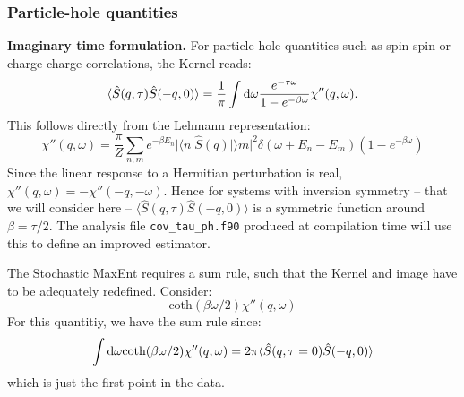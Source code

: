 \subsubsection{Particle-hole quantities }

\noindent
\textbf{Imaginary time formulation.}
 For particle-hole quantities such as spin-spin or charge-charge correlations, 
the  Kernel reads:
\begin{equation}
	\langle \hat{S}(q,\tau) \hat{S}(-q,0) \rangle  = \frac{1}{\pi} 
   \int {\text d} \omega  \frac{e^{- \tau \omega} }{ 1 - e^{-\beta  \omega} } \chi''(q,\omega).
\end{equation}
This follows directly from the  Lehmann representation: 
\begin{equation}
 \chi''(q,\omega)  = \frac{\pi}{Z} \sum_{n,m} e^{-\beta E_n} |\langle n | \hat{S}(q) | \rangle m |^2 
\delta ( \omega + E_n - E_m) \left( 1 - e^{-\beta  \omega} \right) 
\end{equation}
Since the linear response to a Hermitian perturbation  is real, $\chi''(q,\omega)  = - \chi''(-q,-\omega)$.  Hence for systems with inversion symmetry -- that 
we will consider here -- $\langle \hat{S}(q,\tau) \hat{S}(-q,0) \rangle $ is a symmetric function around $\beta= \tau/2$.  The analysis  file \texttt{cov\_tau\_ph.f90} produced at compilation
time will use this  to define an improved estimator. 

The  Stochastic MaxEnt requires a sum rule, such that   the Kernel and image have to be adequately redefined. 
Consider: 
\begin{equation}
	\text{coth}(\beta \omega/2) \chi''(q,\omega)
\end{equation}
For this quantitiy, we have the sum rule since: 
\begin{equation}
	\int {\text d} \omega 	\text{coth}(\beta \omega/2) \chi''(q,\omega) = 
  2 \pi \langle \hat{S}(q,\tau=0) \hat{S}(-q,0) \rangle
\end{equation}
which is just the first point in the data. 

